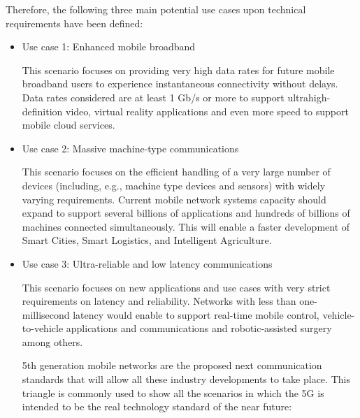 Therefore, the following three main potential use cases \cite{1-17} upon technical requirements have been defined:\par

\begin{itemize}
	\item Use case 1: Enhanced mobile broadband\par

This scenario focuses on providing very high data rates for future mobile broadband users to experience instantaneous connectivity without delays. Data rates considered are at least 1 Gb/s or more to support ultrahigh-definition video, virtual reality applications and even more speed to support mobile cloud services. \par

	\item Use case 2: Massive machine-type communications\par

This scenario focuses on the efficient handling of a very large number of devices (including, e.g., machine type devices and sensors) with widely varying requirements. Current mobile network systems capacity should expand to support several billions of applications and hundreds of billions of machines connected simultaneously. \cite{1-18} This will enable a faster development of Smart Cities, Smart Logistics, and Intelligent Agriculture.\par

	\item Use case 3: Ultra-reliable and low latency communications\par

This scenario focuses on new applications and use cases with very strict requirements on latency and reliability. Networks with less than one-millisecond latency would enable to support real-time mobile control, vehicle-to-vehicle applications and communications and robotic-assisted surgery among others.\par

5th generation mobile networks are the proposed next communication standards that will allow all these industry developments to take place. This triangle is commonly used to show all the scenarios in which the 5G is intended to be the real technology standard of the near future:



\end{itemize}
